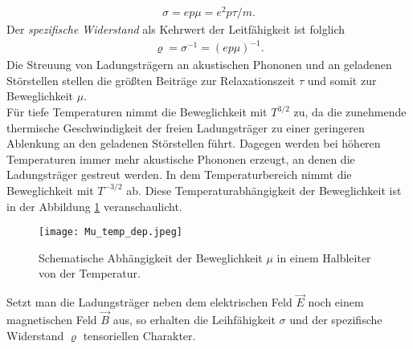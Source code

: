 \begin{align}
\sigma=ep\mu=e^2p\tau/m.
\end{align}
Der \emph{spezifische Widerstand} als Kehrwert der Leitfähigkeit ist folglich
\begin{align}
\varrho=\sigma^{-1}=(ep\mu)^{-1}.
\end{align}
Die Streuung von Ladungsträgern an akustischen Phononen und an geladenen Störstellen stellen die größten Beiträge zur Relaxationszeit $\tau$ und somit   zur Beweglichkeit $\mu$.\\
Für tiefe Temperaturen nimmt die Beweglichkeit mit $T^{3/2}$ zu, da die zunehmende thermische Geschwindigkeit der freien Ladungsträger zu einer geringeren Ablenkung an den geladenen Störstellen führt. Dagegen werden bei höheren Temperaturen immer mehr akustische Phononen erzeugt, an denen die Ladungsträger gestreut werden. In dem Temperaturbereich nimmt die Beweglichkeit mit $T^{-3/2}$ ab. Diese Temperaturabhängigkeit der Beweglichkeit ist in der Abbildung \ref{fig:mu-temp_dep} veranschaulicht.
\begin{figure}[h!]
\centering
\texttt{[image: Mu\_temp\_dep.jpeg]}
\caption{Schematische Abhängigkeit der Beweglichkeit $\mu$ in einem Halbleiter von der Temperatur. \cite{lit:GroMa14}}
\label{fig:mu-temp_dep}
\end{figure}
Setzt man die Ladungsträger neben dem elektrischen Feld $\vec{E}$ noch einem magnetischen Feld $\vec{B}$ aus, so erhalten die Leihfähigkeit $\sigma$ und der spezifische Widerstand $\varrho$ tensoriellen Charakter.
